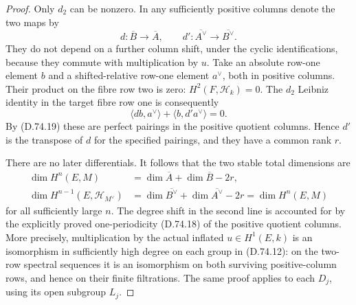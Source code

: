 \begin{proof}
Only $d_2$ can be nonzero.  In any sufficiently
positive columns denote the two maps by
\[
 d:\overline B\longrightarrow\overline A,\qquad
 d':\overline{A^\vee}\longrightarrow\overline{B^\vee}.
 \tag{D.74.22}
\]
They do not depend on a further column shift, under
the cyclic identifications, because they commute
with multiplication by $u$.  Take an absolute
row-one element $b$ and a shifted-relative row-one
element $a^\vee$, both in positive columns.
Their product on the fibre row two is zero:
$H^2(F,\mathscr H_k)=0$.  The $d_2$ Leibniz
identity in the target fibre row one is consequently
\[
           \langle d b,a^\vee\rangle+
                    \langle b,d'a^\vee\rangle=0 .
 \tag{D.74.23}
\]
By (D.74.19) these are perfect pairings in the
positive quotient columns.  Hence $d'$ is the
transpose of $d$ for the specified pairings, and
they have a common rank $r$.

There are no later differentials.  It follows that
the two stable total dimensions are
\[
 \begin{split}
 \dim H^n(E,M)
       &=\dim\overline A+\dim\overline B-2r,\\
 \dim H^{n-1}(E,\mathscr H_{M^\vee})
       &=\dim\overline{B^\vee}+
                    \dim\overline{A^\vee}-2r
        =\dim H^n(E,M)
 \end{split}
 \tag{D.74.24}
\]
for all sufficiently large $n$.  The degree shift
in the second line is accounted for by the explicitly
proved one-periodicity (D.74.18) of the positive
quotient columns.  More precisely,
multiplication by the actual inflated $u\in H^1(E,k)$
is an isomorphism in sufficiently high degree on
each group in (D.74.12): on the two-row spectral
sequences it is an isomorphism on both surviving
positive-column rows, and hence on their finite
filtrations.  The same proof applies to each $D_j$,
using its open subgroup $L_j$.


\end{proof}
